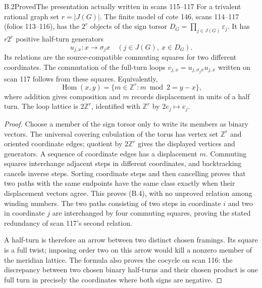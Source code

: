 \begin{result}{B.2}{Proved}{The presentation actually written in scans 115--117}
For a trivalent rational graph set $r=|J(G)|$.  The finite model of
cote 146, scans 114--117 (folios 113--116), has the $2^r$ objects of
the sign torsor $D_G=\prod_{j\in J(G)}\varepsilon_j$.  It has
$r2^r$ positive half-turn generators
\[
 u_{j,x}:x\longrightarrow\sigma_jx
 \quad(j\in J(G),\ x\in D_G).
\]
Its relations are the source-compatible commuting squares for two
different coordinates.  The commutation of the full-turn loops
$v_{j,x}=u_{j,\sigma_jx}u_{j,x}$ written on scan 117 follows from
these squares.  Equivalently,
\[
 \operatorname{Hom}(x,y)=
 \{m\in\mathbb Z^r:m\bmod2=y-x\},
 \tag{B.4}
\]
where addition gives composition and $m$ records displacement in
units of a half turn.  The loop lattice is $2\mathbb Z^r$, identified
with $\mathbb Z^r$ by $2e_j\mapsto e_j$.
\end{result}
\begin{proof}
Choose a member of the sign torsor only to write its members as
binary vectors.  The universal covering cubulation of the torus has
vertex set $\mathbb Z^r$ and oriented coordinate edges; quotient by
$2\mathbb Z^r$ gives the displayed vertices and generators.  A
sequence of coordinate edges has a displacement $m$.  Commuting
squares interchange adjacent steps in different coordinates, and
backtracking cancels inverse steps.  Sorting coordinate steps and
then cancelling proves that two paths with the same endpoints have
the same class exactly when their displacement vectors agree.
This proves (B.4), with no unproved relation among winding numbers.
The two paths consisting of two steps in coordinate $i$ and two in
coordinate $j$ are interchanged by four commuting squares, proving
the stated redundancy of scan 117's second relation.

A half-turn is therefore an arrow between two distinct chosen
framings.  Its square is a full twist; imposing order two on this
arrow would kill a nonzero member of the meridian lattice.  The
formula also proves the cocycle on scan 116: the discrepancy between
two chosen binary half-turns and their chosen product is one full
turn in precisely the coordinates where both signs are negative.
\end{proof}

